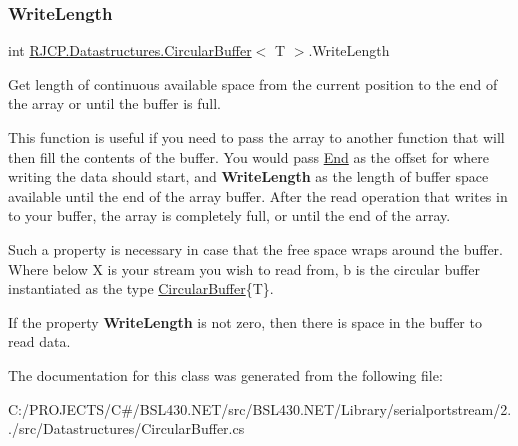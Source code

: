 \subsubsection{\texorpdfstring{WriteLength}{WriteLength}}
{\footnotesize\ttfamily int \mbox{\hyperlink{class_r_j_c_p_1_1_datastructures_1_1_circular_buffer}{R\+J\+C\+P.\+Datastructures.\+Circular\+Buffer}}$<$ T $>$.Write\+Length\hspace{0.3cm}{\ttfamily [get]}}



Get length of continuous available space from the current position to the end of the array or until the buffer is full. 

This function is useful if you need to pass the array to another function that will then fill the contents of the buffer. You would pass \mbox{\hyperlink{class_r_j_c_p_1_1_datastructures_1_1_circular_buffer_a8e98be8b2cf3d34965db9d7813443169}{End}} as the offset for where writing the data should start, and {\bfseries{Write\+Length}} as the length of buffer space available until the end of the array buffer. After the read operation that writes in to your buffer, the array is completely full, or until the end of the array. 

Such a property is necessary in case that the free space wraps around the buffer. Where below {\ttfamily X} is your stream you wish to read from, {\ttfamily b} is the circular buffer instantiated as the type {\ttfamily \mbox{\hyperlink{class_r_j_c_p_1_1_datastructures_1_1_circular_buffer}{Circular\+Buffer}}\{T\}}. 
\begin{DoxyCode}{0}
\end{DoxyCode}
 If the property {\bfseries{Write\+Length}} is not zero, then there is space in the buffer to read data.

The documentation for this class was generated from the following file\+:\begin{DoxyCompactItemize}
\item 
C\+:/\+P\+R\+O\+J\+E\+C\+T\+S/\+C\#/\+B\+S\+L430.\+N\+E\+T/src/\+B\+S\+L430.\+N\+E\+T/\+Library/serialportstream/2../src/\+Datastructures/Circular\+Buffer.\+cs\end{DoxyCompactItemize}
